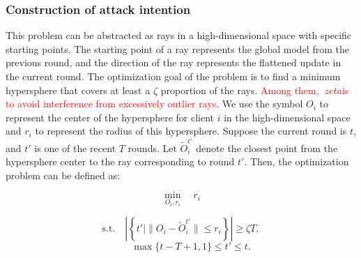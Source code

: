 \documentclass[lettersize,journal]{IEEEtran}
\begin{document}
\subsubsection{Construction of attack intention}
This problem can be abstracted as rays in a high-dimensional space with specific starting points. The starting point of a ray represents the global model from the previous round, and the direction of the ray represents the flattened update in the current round. The optimization goal of the problem is to find a minimum hypersphere that covers at least a $\zeta$ proportion of the rays. \textcolor{red}{Among them, $\ zeta $is to avoid interference from excessively outlier rays}.
We use the symbol $O_i$ to represent the center of the hypersphere for client $i$ in the high-dimensional space and $r_i$ to represent the radius of this hypersphere. Suppose the current round is $t$, and $t'$ is one of the recent $T$ rounds. Let $\tilde O_i^{t'}$ denote the closest point from the hypersphere center to the ray corresponding to round $t'$. Then, the optimization problem can be defined as:

\begin{equation}
    \min_{O_i, r_i} \quad r_i
\end{equation}

\begin{equation} 
\text{s.t.} \quad \left| \left\{ t' \mid \| O_i - \tilde{O}_{i}^{t'} \| \leq r_i \right\} \right| \geq \zeta T,
\end{equation}
\begin{equation} 
    \quad\quad\max\{t-T+1, 1\}\leq  t'\leq t.
\end{equation}
\end{document}

